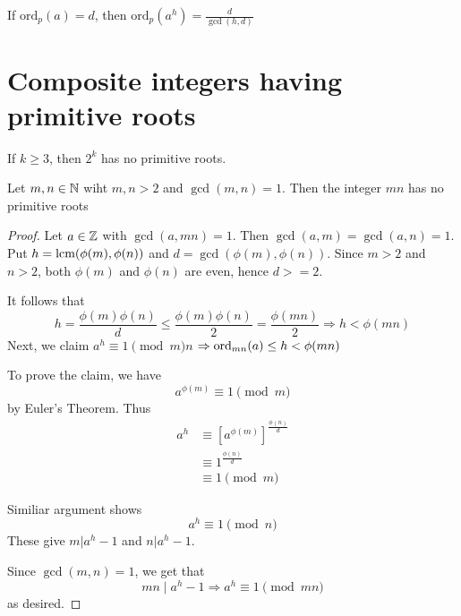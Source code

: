 \begin{remark}
    If $\text{ord}_{p}(a) = d$, then $\text{ord}_{p}(a^h) = \frac{d}{\gcd(h, d)}$
\end{remark}


\section{Composite integers having primitive roots}
\setcounter{theorem}{-1}
\begin{theorem}
    If $k \geq 3$, then $2^k$ has no primitive roots.
\end{theorem}
\setcounter{theorem}{7}
\begin{theorem}
    Let $m, n \in \mathbb{N}$ wiht $m, n > 2$ and $\gcd(m, n) = 1$.
    Then the integer $mn$ has no primitive roots
\end{theorem}
\begin{proof}
    Let $a \in \mathbb{Z}$ with $\gcd(a, mn) = 1$. Then $\gcd(a, m) = \gcd(a, n) = 1$.
    Put $h = \text{lcm}(\phi(m), \phi(n))$ and $d = \gcd(\phi(m), \phi(n))$.
    Since $m > 2$ and $n > 2$, both $\phi(m)$ and $\phi(n)$ are even, hence $d >= 2$.

    It follows that
    \[
        h = \frac{\phi(m)\phi(n)}{d} \leq \frac{\phi(m)\phi(n)}{2} = \frac{\phi(mn)}{2} \Rightarrow h < \phi(mn)
    \]
    Next, we claim $a^h \equiv 1 \pmod mn$
    $\Rightarrow \text{ord}_{mn}(a) \leq h < \phi(mn)$

    To prove the claim, we have
    \[
        a^{\phi(m)} \equiv 1 \pmod m
    \]
    by Euler's Theorem. Thus 
    \[
        \begin{aligned}
            a^h &\equiv {[a^{\phi(m)}]}^\frac{\phi(n)}{d}\\
            & \equiv 1^\frac{\phi(n)}{d}\\
            & \equiv 1 \pmod m
        \end{aligned}
    \]

    Similiar argument shows 
    \[
        a^h \equiv 1 \pmod n
    \]
    These give $m | a^h - 1$ and $n | a^h - 1$.

    Since $\gcd(m, n) = 1$, we get that
    \[
        mn \; | \; a^h - 1 \Rightarrow a^h \equiv 1 \pmod{mn}
    \]
    as desired.
\end{proof}

